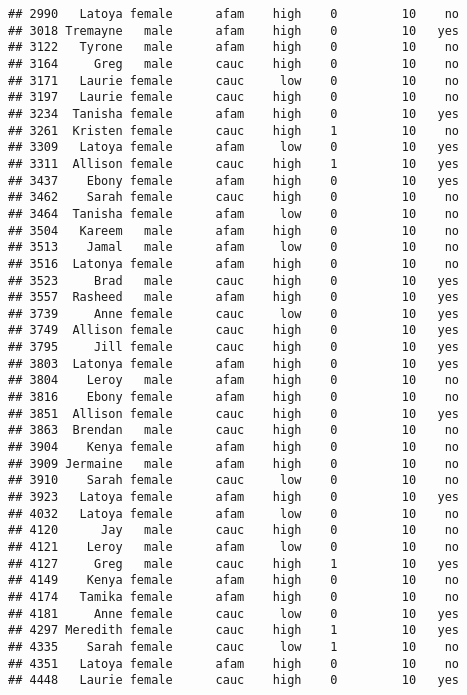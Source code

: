 \documentclass[
]{article}
\begin{document}
\begin{verbatim}
## 2990   Latoya female      afam    high    0         10    no
## 3018 Tremayne   male      afam    high    0         10   yes
## 3122   Tyrone   male      afam    high    0         10    no
## 3164     Greg   male      cauc    high    0         10    no
## 3171   Laurie female      cauc     low    0         10    no
## 3197   Laurie female      cauc    high    0         10    no
## 3234  Tanisha female      afam    high    0         10   yes
## 3261  Kristen female      cauc    high    1         10    no
## 3309   Latoya female      afam     low    0         10   yes
## 3311  Allison female      cauc    high    1         10   yes
## 3437    Ebony female      afam    high    0         10   yes
## 3462    Sarah female      cauc    high    0         10    no
## 3464  Tanisha female      afam     low    0         10    no
## 3504   Kareem   male      afam    high    0         10    no
## 3513    Jamal   male      afam     low    0         10    no
## 3516  Latonya female      afam    high    0         10    no
## 3523     Brad   male      cauc    high    0         10   yes
## 3557  Rasheed   male      afam    high    0         10   yes
## 3739     Anne female      cauc     low    0         10   yes
## 3749  Allison female      cauc    high    0         10   yes
## 3795     Jill female      cauc    high    0         10   yes
## 3803  Latonya female      afam    high    0         10   yes
## 3804    Leroy   male      afam    high    0         10    no
## 3816    Ebony female      afam    high    0         10    no
## 3851  Allison female      cauc    high    0         10   yes
## 3863  Brendan   male      cauc    high    0         10    no
## 3904    Kenya female      afam    high    0         10    no
## 3909 Jermaine   male      afam    high    0         10    no
## 3910    Sarah female      cauc     low    0         10    no
## 3923   Latoya female      afam    high    0         10   yes
## 4032   Latoya female      afam     low    0         10    no
## 4120      Jay   male      cauc    high    0         10    no
## 4121    Leroy   male      afam     low    0         10    no
## 4127     Greg   male      cauc    high    1         10   yes
## 4149    Kenya female      afam    high    0         10    no
## 4174   Tamika female      afam    high    0         10    no
## 4181     Anne female      cauc     low    0         10   yes
## 4297 Meredith female      cauc    high    1         10   yes
## 4335    Sarah female      cauc     low    1         10    no
## 4351   Latoya female      afam    high    0         10    no
## 4448   Laurie female      cauc    high    0         10   yes

\end{verbatim}
\end{document}

